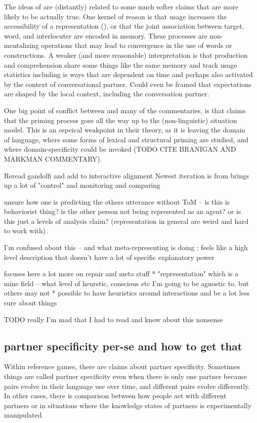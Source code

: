 \documentclass[]{article}
\begin{document}
The ideas of \cite{pickering2004} are (distantly) related to some much softer claims that are more likely to be actually true. One kernel of reason is that usage increases the accessibility of a representation (\cite{macdonald1994}), or that the joint association between target, word, and interlocuter are encoded in memory. These processes are non-mentalizing operations that may lead to convergence in the use of words or constructions. A weaker (and more reasonable) interpretation is that production and comprehension share some things like the same memory and track usage statistics including is ways that are dependent on time and perhaps also activated by the context of conversational partner.  Could even be framed that expectations are shaped by the local context, including the conversation partner. 

One big point of conflict between \cite{pickering2004} and many of the commentaries, is that \cite{pickering2004} claims that the priming process goes all the way up to the (non-linguistic) situation model. This is an espeical weakpoint in their theory, as it is leaving the domain of language, where some forms of lexical and structural priming are studied, and where domain-specificity could be invoked (TODO CITE BRANIGAN AND MARKMAN COMMENTARY). 

Reread gandolfi and add to interactive alignment
Newest iteration is from \cite{gandolfi2022} brings up a lot of "control" and monitoring and comparing 

unsure how one is predicting the others utterance without ToM -- is this is behaviorist thing? is the other person not being represented as an agent? or is this just a levels of analysis claim? (representation in general are weird and hard to work with)

I'm confused about this -- and what meta-representing is doing ; feels like a high level description that doesn't have a lot of specific explanatory power

focuses here a lot more on repair and meta stuff 
* "representation" which is a mine field -- what level of heurstic, conscious etc I'm going to be agnostic to, but others may not
* possible to have heuristics around interactions and be a lot less sure about things

TODO really I'm mad that I had to read and know about this nonsense

\subsection{partner specificity per-se and how to get that}
Within reference games, there are claims about partner specificity. Sometimes things are called partner specificity even when there is only one partner because pairs evolve in their language use over time, and different pairs evolve differently. In other cases, there is comparison between how people act with different partners or in situations where the knowledge states of partners is experimentally manipulated. 
\end{document}
